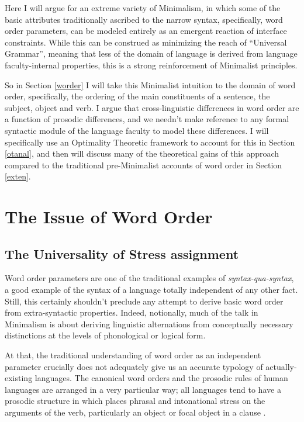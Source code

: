 \documentclass{article}
\begin{document}
Here I will argue for an extreme variety of Minimalism, in which some of the basic attributes traditionally ascribed to the narrow syntax, specifically, word order parameters, can be modeled entirely as an emergent reaction of interface constraints.
While this can be construed as minimizing the reach of ``Universal Grammar'', meaning that less of the domain of language is derived from language faculty-internal properties, this is a strong reinforcement of Minimalist principles.

So in Section \ref{worder} I will take this Minimalist intuition to the domain of word order, specifically, the ordering of the main constituents of a sentence, the subject, object and verb.
I argue that cross-linguistic differences in word order are a function of prosodic differences, and we needn't make reference to any formal syntactic module of the language faculty to model these differences.
I will specifically use an Optimality Theoretic framework to account for this in Section \ref{otanal}, and then will discuss many of the theoretical gains of this approach compared to the traditional pre-Minimalist accounts of word order in Section \ref{exten}.

\section{The Issue of Word Order\label{worder}}

\subsection{The Universality of Stress assignment}

Word order parameters are one of the traditional examples of \textit{syntax-qua-syntax}, a good example of the syntax of a language totally independent of any other fact.
Still, this certainly shouldn't preclude any attempt to derive basic word order from extra-syntactic properties.
Indeed, notionally, much of the talk in Minimalism is about deriving linguistic alternations from conceptually necessary distinctions at the levels of phonological or logical form.

At that, the traditional understanding of word order as an independent parameter crucially does not adequately give us an accurate typology of actually-existing languages.
The canonical word orders and the prosodic rules of human languages are arranged in a very particular way; all languages tend to have a prosodic structure in which places phrasal and intonational stress on the arguments of the verb, particularly an object or focal object in a clause \parencite{gundel88}.
\end{document}
